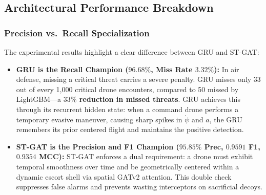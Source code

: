 \documentclass[9pt]{ieeeconf}
\begin{document}
\begin{table}[t]
\centering
\caption{Master Cross-Model Benchmark Comparison on Held-Out Test Scenarios (305,016 Total Frames)}
\label{tab:master_benchmark}
\scriptsize
{}
\end{table}

\subsection{Architectural Performance Breakdown}

\subsubsection{Precision vs.\ Recall Specialization}
The experimental results highlight a clear difference between GRU and ST-GAT:
\begin{itemize}
    \item \textbf{GRU is the Recall Champion ($96.68\%$, Miss Rate $3.32\%$):} In air defense, missing a critical threat carries a severe penalty. GRU misses only 33 out of every 1,000 critical drone encounters, compared to 50 missed by LightGBM---a \textbf{$33\%$ reduction in missed threats}. GRU achieves this through its recurrent hidden state: when a command drone performs a temporary evasive maneuver, causing sharp spikes in $\dot{\psi}$ and $a$, the GRU remembers its prior centered flight and maintains the positive detection.
    \item \textbf{ST-GAT is the Precision and F1 Champion ($95.85\%$ Prec, $0.9591$ F1, $0.9354$ MCC):} ST-GAT enforces a dual requirement: a drone must exhibit temporal smoothness over time and be geometrically centered within a dynamic escort shell via spatial GATv2 attention. This double check suppresses false alarms and prevents wasting interceptors on sacrificial decoys.
\end{itemize}
\end{document}
